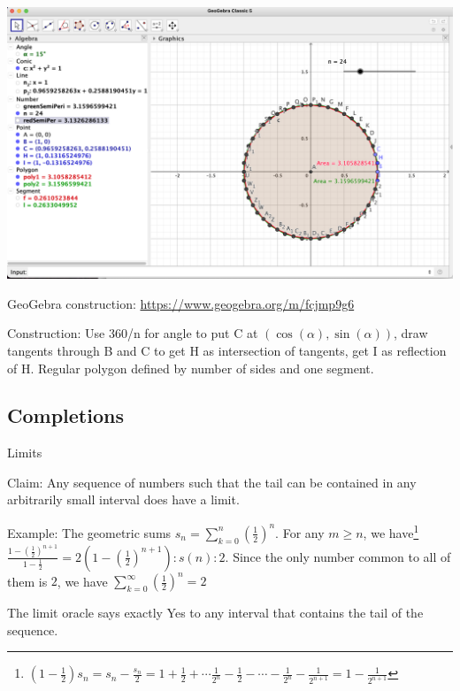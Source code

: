 \documentclass{beamer}
\begin{document}
\begin{frame}

   \includegraphics[width=\textwidth]{Images/flexible-hexagon-circle-24.png}

  GeoGebra construction:  \url{https://www.geogebra.org/m/fcjmp9g6}
  \begin{tiny}
  Construction: Use 360/n for angle to put C at $(\cos(\alpha), \sin(\alpha))$, draw tangents through B and C to get H as intersection of tangents,  get I as reflection of H. Regular polygon defined by number of sides and one segment. 
  
  \end{tiny}
\end{frame}


\subsection{Completions}

\begin{frame}{Limits}

Claim: Any sequence of numbers such that the tail can be contained in any arbitrarily small interval does have a limit. 

Example: The geometric sums $s_n = \sum_{k=0}^n (\frac{1}{2})^n$. For any $m \geq n$, we have\footnote{$(1-\frac{1}{2} ) s_n = s_n - \frac{s_n}{2} = 1 + \frac{1}{2} + \cdots \frac{1}{2^n} - \frac{1}{2} - \cdots -\frac{1}{2^n} - \frac{1}{2^{n+1} } = 1 - \frac{1}{2^{n+1}}$ } $\frac{1 - (\frac{1}{2})^{n+1}}{1 - \frac{1}{2}}= 2 (1 - (\frac{1}{2})^{n+1}):s(n):2$. Since the only number common to all of them is $2$, we have $\sum_{k=0}^{\infty} (\frac{1}{2})^n = 2$

The limit oracle says exactly Yes to any interval that contains the tail of the sequence. 


    
\end{frame}
\end{document}
